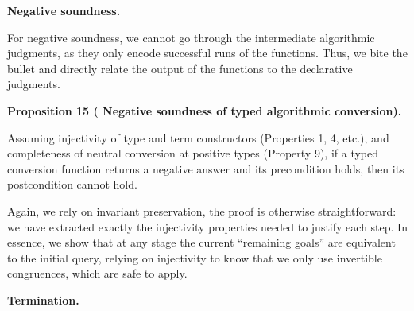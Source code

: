  
 
 
\par\medskip\noindent\textbf{Negative soundness.}\par
 
 
For negative soundness, we cannot go through the intermediate algorithmic judgments, as they only encode successful runs of the functions. Thus, we bite the bullet and directly relate the output of the functions to the declarative judgments.\par
 
 
 
\par\medskip\noindent\textbf{Proposition 15 (  Negative soundness of typed algorithmic conversion).}\par
 
 
Assuming injectivity of type and term constructors (Properties 1, 4, etc.), and completeness of neutral conversion at positive types (Property 9), if a typed conversion function returns a negative answer and its precondition holds, then its postcondition cannot hold.\par
 
 
 
 
Again, we rely on invariant preservation, the proof is otherwise straightforward: we have extracted exactly the injectivity properties needed to justify each step. In essence, we show that at any stage the current “remaining goals” are equivalent to the initial query, relying on injectivity to know that we only use invertible congruences, which are safe to apply.\par
 
 
 
 
\par\medskip\noindent\textbf{Termination.}\par
 
 
